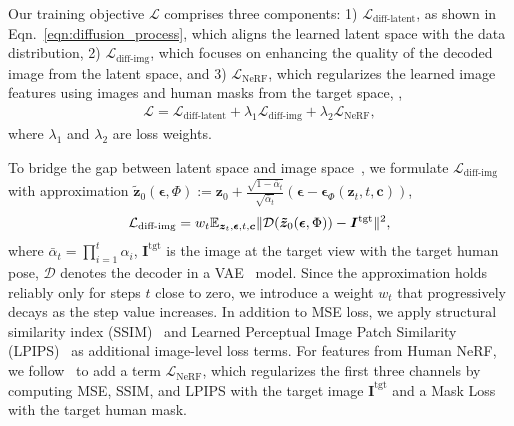 Our training objective $\mathcal{L}$ comprises three components: 1) $\mathcal{L}_\text{diff-latent}$, as shown in Eqn.~\ref{eqn:diffusion_process}, which aligns the learned latent space with the data distribution, 2) $\mathcal{L}_\text{diff-img}$, which focuses on enhancing the quality of the decoded image from the latent space, and 3) $\mathcal{L}_\text{NeRF}$, which regularizes the learned image features using images and human masks from the target space, \ie, 
\begin{equation}
\label{loss: overall}
\begin{aligned}
\mathcal{L} = \mathcal{L}_\text{diff-latent} + \lambda_{1}\mathcal{L}_\text{diff-img} + \lambda_{2}\mathcal{L}_\text{NeRF},
\end{aligned}
\end{equation}
where $\lambda_1$ and $\lambda_2$ are loss weights.

To bridge the gap between latent space and image space~\cite{muller2023diffrf}, we formulate $\mathcal{L}_\text{diff-img}$ with approximation $\bm{\tilde{z}}_{0}(\bm{\epsilon},\Phi):= \bm{z}_{0} + \frac{\sqrt{1-\bar{\alpha}_{t}}}{\sqrt{\bar{\alpha}_{t}}} (\bm{\epsilon} - \bm{\epsilon}_{\Phi}(\bm{z}_{t}, t, \bm{c}))$,
\begin{equation}
\label{eqn:diff_img_loss}
    \begin{aligned}
        \mathcal{L}_\text{diff-img}=w_t\mathbb{E}_{\bm{z}_{t}, \bm{\epsilon}, t, \bm{c}}\Arrowvert\mathcal{D}(\bm{\tilde{z}}_{0}(\bm{\epsilon},\Phi)) - \bm{I}^\text{tgt} \Arrowvert^{2},
    \end{aligned}
\end{equation}
where $\bar{\alpha}_{t}=\prod_{i=1}^{t}\alpha_i$, $\bm{I}^\text{tgt}$ is the image at the target view with the target human pose, $\mathcal{D}$ denotes the decoder in a VAE~\cite{kingma2013auto, van2017neural} model.
Since the approximation holds reliably only for steps $t$ close to zero, we introduce a weight $w_t$ that progressively decays as the step value increases. 
In addition to MSE loss, we apply structural similarity index (SSIM)~\cite{wang2004image} and Learned Perceptual Image Patch Similarity (LPIPS)~\cite{zhang2018unreasonable} as additional image-level loss terms.
For features from Human NeRF, we follow~\cite{chan2022efficient} to add a term $\mathcal{L}_\text{NeRF}$, which regularizes the first three channels by computing MSE, SSIM, and LPIPS with the target image $\bm{I}^\text{tgt}$ and a Mask Loss with the target human mask.
